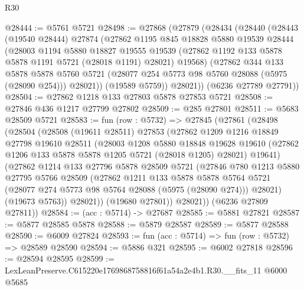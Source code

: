 \begin{lexlean}{R30}
\begin{coremodule}
@28444 := @5761 @5721
@28498 := @27868
    (@27879
      (@28434
        (@28440
          (@28443
            (@19540 @28444)
            @27874
            (@27862
              @1195
              @845
              @18828
              @5880
              @19539
              @28444
              (@28003
                @1194
                @5880
                @18827
                @19555
                @19539
                (@27862 @1192 @133 @5878 @5878 @1191 @5721 (@28018 @1191) @28021)
                @19568)
              (@27862
                @344
                @133
                @5878
                @5878
                @5760
                @5721
                (@28077 @254 @5773 @98 @5760 @28088 (@5975 (@28090 @254)))
                @28021))
            (@19589 @5759))
          @28021))
      (@6236 @27789 @27791))
@28504 := @27862 @1218 @133 @27803 @5878 @27853 @5721
@28508 := @27846 @436 @1217 @27799 @27802
@28509 := @285 @27801
@28511 := @5683 @28509 @5721
@28583 := fun (row : @5732) =>
  @27845
    (@27861
      (@28498
        (@28504
          (@28508
            (@19611 @28511)
            @27853
            (@27862
              @1209
              @1216
              @18849
              @27798
              @19610
              @28511
              (@28003
                @1208
                @5880
                @18848
                @19628
                @19610
                (@27862 @1206 @133 @5878 @5878 @1205 @5721 (@28018 @1205) @28021)
                @19641)
              (@27862
                @1214
                @133
                @27796
                @5878
                @28509
                @5721
                (@27846
                  @780
                  @1213
                  @5880
                  @27795
                  @5766
                  @28509
                  (@27862
                    @1211
                    @133
                    @5878
                    @5878
                    @5764
                    @5721
                    (@28077 @274 @5773 @98 @5764 @28088 (@5975 (@28090 @274)))
                    @28021)
                  (@19673 @5763))
                @28021))
            (@19680 @27801))
          @28021))
      (@6236 @27809 @27811))
@28584 := (acc : @5714) -> @27687
@28585 := @5881 @27821
@28587 := @5877 @28585 @5878
@28588 := @5879 @28587
@28589 := @5877 @28588
@28590 := @6009 @27824
@28593 := fun (acc : @5714) => fun (row : @5732) => @28589 @28590
@28594 := @5886 @321
@28595 := @6002 @27818
@28596 := @28594 @28595
@28599 := LexLeanPreserve.C615220e1769868758816f61a54a2e4b1.R30.__fits_11 @6000 @5685

\end{coremodule}
\end{lexlean}
